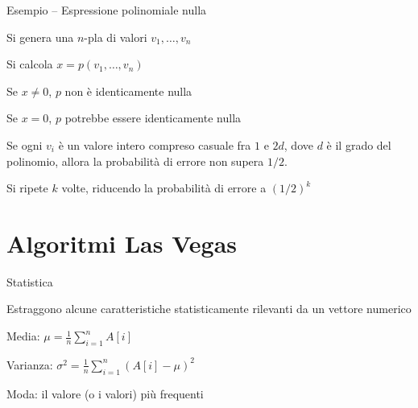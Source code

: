 \begin{frame}{Esempio -- Espressione polinomiale nulla}

\vspace{-9pt}
\begin{myboxtitle}[Algoritmo]
\BIL
\item Si genera una $n$-pla di valori $v_1, \ldots, v_n$
\item Si calcola $x= p(v_1 , \ldots , v_n)$
  \BI
	\item Se $x \neq 0$, $p$ non è identicamente nulla
	\item Se $x = 0$, $p$ \alert{potrebbe} essere identicamente nulla
	\EI
\item Se ogni $v_i$ è un valore intero compreso casuale fra $1$ e $2d$, dove $d$ è 
il grado del polinomio, allora la probabilità di errore non supera $1/2$.
\item Si ripete $k$ volte, riducendo la probabilità di errore a $(1/2)^k$
\EIL
\end{myboxtitle}

\end{frame}

\section{Algoritmi Las Vegas}

\begin{frame}{Statistica}

\vspace{-9pt}
\begin{myboxtitle}
Estraggono alcune caratteristiche statisticamente rilevanti da un vettore numerico 
\end{myboxtitle}

\begin{myboxtitle}[Esempi]
\BIL
\item \alert{Media}: $\mu = \frac{1}{n} 	\sum_{i=1}^n A[i]$
\item \alert{Varianza}: $\sigma^2 = \frac{1}{n} \sum_{i=1}^n (A[i]- \mu)^2$
\item \alert{Moda}: il valore (o i valori) più frequenti
\EIL
\end{myboxtitle}
\end{frame}

